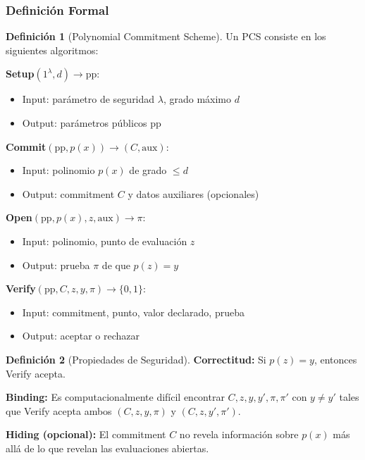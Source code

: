 \documentclass[11pt,a4paper,twoside,openright]{book}
\theoremstyle{definition}
\newtheorem{definition}{Definición}[chapter]
\theoremstyle{plain}
\theoremstyle{remark}
\begin{document}
\subsubsection{Definición Formal}

\begin{definition}[Polynomial Commitment Scheme]
Un PCS consiste en los siguientes algoritmos:

\textbf{Setup}$(1^\lambda, d) \to \text{pp}$:
\begin{itemize}
    \item Input: parámetro de seguridad $\lambda$, grado máximo $d$
    \item Output: parámetros públicos pp
\end{itemize}

\textbf{Commit}$(\text{pp}, p(x)) \to (C, \text{aux})$:
\begin{itemize}
    \item Input: polinomio $p(x)$ de grado $\leq d$
    \item Output: commitment $C$ y datos auxiliares (opcionales)
\end{itemize}

\textbf{Open}$(\text{pp}, p(x), z, \text{aux}) \to \pi$:
\begin{itemize}
    \item Input: polinomio, punto de evaluación $z$
    \item Output: prueba $\pi$ de que $p(z) = y$
\end{itemize}

\textbf{Verify}$(\text{pp}, C, z, y, \pi) \to \{0, 1\}$:
\begin{itemize}
    \item Input: commitment, punto, valor declarado, prueba
    \item Output: aceptar o rechazar
\end{itemize}
\end{definition}

\begin{definition}[Propiedades de Seguridad]
\textbf{Correctitud:} Si $p(z) = y$, entonces Verify acepta.

\textbf{Binding:} Es computacionalmente difícil encontrar $C, z, y, y', \pi, \pi'$ con $y \neq y'$ tales que Verify acepta ambos $(C, z, y, \pi)$ y $(C, z, y', \pi')$.

\textbf{Hiding (opcional):} El commitment $C$ no revela información sobre $p(x)$ más allá de lo que revelan las evaluaciones abiertas.
\end{definition}
\end{document}
